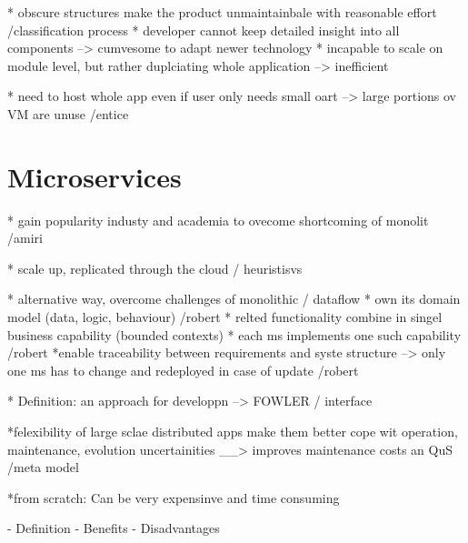 * obscure structures make the product unmaintainbale with reasonable effort /classification process
* developer cannot keep detailed insight into all components --> cumvesome to adapt newer technology
* incapable to scale on module level, but rather duplciating whole application --> inefficient


* need to host whole app even if user only needs small oart --> large portions ov VM are unuse /entice




\section{Microservices}
\label{sec:background:microservices}
* gain popularity industy and academia to ovecome shortcoming of monolit /amiri

* scale up, replicated through the cloud / heuristisvs

* alternative way, overcome challenges of monolithic / dataflow
* own its domain model (data, logic, behaviour) /robert
*  relted functionality combine in singel business capability (bounded contexts)
* each ms implements one such capability /robert
*enable traceability between requirements and syste structure --> only one ms has to change and redeployed in case of update /robert

* Definition: an approach for developpn --> FOWLER  / interface

*felexibility of large sclae distributed apps make them better cope wit operation, maintenance, evolution uncertainities __> improves maintenance costs an QuS /meta model

*from scratch: Can be very expensinve and time consuming

- Definition
- Benefits
- Disadvantages

